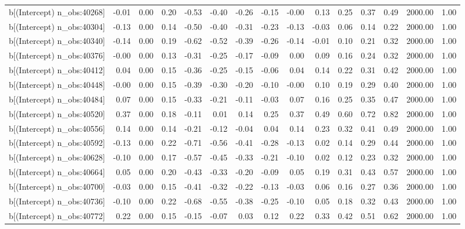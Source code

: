 \begin{table}[ht]
\begin{tabular}{rrrrrrrrrrrrrrr}
  b[(Intercept) n\_obs:40268] & -0.01 & 0.00 & 0.20 & -0.53 & -0.40 & -0.26 & -0.15 & -0.00 & 0.13 & 0.25 & 0.37 & 0.49 & 2000.00 & 1.00 \\ 
  b[(Intercept) n\_obs:40304] & -0.13 & 0.00 & 0.14 & -0.50 & -0.40 & -0.31 & -0.23 & -0.13 & -0.03 & 0.06 & 0.14 & 0.22 & 2000.00 & 1.00 \\ 
  b[(Intercept) n\_obs:40340] & -0.14 & 0.00 & 0.19 & -0.62 & -0.52 & -0.39 & -0.26 & -0.14 & -0.01 & 0.10 & 0.21 & 0.32 & 2000.00 & 1.00 \\ 
  b[(Intercept) n\_obs:40376] & -0.00 & 0.00 & 0.13 & -0.31 & -0.25 & -0.17 & -0.09 & 0.00 & 0.09 & 0.16 & 0.24 & 0.32 & 2000.00 & 1.00 \\ 
  b[(Intercept) n\_obs:40412] & 0.04 & 0.00 & 0.15 & -0.36 & -0.25 & -0.15 & -0.06 & 0.04 & 0.14 & 0.22 & 0.31 & 0.42 & 2000.00 & 1.00 \\ 
  b[(Intercept) n\_obs:40448] & -0.00 & 0.00 & 0.15 & -0.39 & -0.30 & -0.20 & -0.10 & -0.00 & 0.10 & 0.19 & 0.29 & 0.40 & 2000.00 & 1.00 \\ 
  b[(Intercept) n\_obs:40484] & 0.07 & 0.00 & 0.15 & -0.33 & -0.21 & -0.11 & -0.03 & 0.07 & 0.16 & 0.25 & 0.35 & 0.47 & 2000.00 & 1.00 \\ 
  b[(Intercept) n\_obs:40520] & 0.37 & 0.00 & 0.18 & -0.11 & 0.01 & 0.14 & 0.25 & 0.37 & 0.49 & 0.60 & 0.72 & 0.82 & 2000.00 & 1.00 \\ 
  b[(Intercept) n\_obs:40556] & 0.14 & 0.00 & 0.14 & -0.21 & -0.12 & -0.04 & 0.04 & 0.14 & 0.23 & 0.32 & 0.41 & 0.49 & 2000.00 & 1.00 \\ 
  b[(Intercept) n\_obs:40592] & -0.13 & 0.00 & 0.22 & -0.71 & -0.56 & -0.41 & -0.28 & -0.13 & 0.02 & 0.14 & 0.29 & 0.44 & 2000.00 & 1.00 \\ 
  b[(Intercept) n\_obs:40628] & -0.10 & 0.00 & 0.17 & -0.57 & -0.45 & -0.33 & -0.21 & -0.10 & 0.02 & 0.12 & 0.23 & 0.32 & 2000.00 & 1.00 \\ 
  b[(Intercept) n\_obs:40664] & 0.05 & 0.00 & 0.20 & -0.43 & -0.33 & -0.20 & -0.09 & 0.05 & 0.19 & 0.31 & 0.43 & 0.57 & 2000.00 & 1.00 \\ 
  b[(Intercept) n\_obs:40700] & -0.03 & 0.00 & 0.15 & -0.41 & -0.32 & -0.22 & -0.13 & -0.03 & 0.06 & 0.16 & 0.27 & 0.36 & 2000.00 & 1.00 \\ 
  b[(Intercept) n\_obs:40736] & -0.10 & 0.00 & 0.22 & -0.68 & -0.55 & -0.38 & -0.25 & -0.10 & 0.05 & 0.18 & 0.32 & 0.43 & 2000.00 & 1.00 \\ 
  b[(Intercept) n\_obs:40772] & 0.22 & 0.00 & 0.15 & -0.15 & -0.07 & 0.03 & 0.12 & 0.22 & 0.33 & 0.42 & 0.51 & 0.62 & 2000.00 & 1.00 \\ 

\end{tabular}
\end{table}

